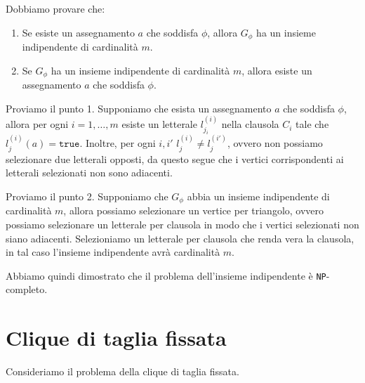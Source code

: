 \begin{itemize}
\begin{figure}[H]
    \end{figure}
    Dobbiamo provare che:
    \begin{enumerate}
        \item Se esiste un assegnamento $a$ che soddisfa $\phi$, allora $G_\phi$ ha un insieme indipendente
        di cardinalità $m$.
        \item Se $G_\phi$ ha un insieme indipendente di cardinalità $m$, allora esiste un assegnamento $a$
        che soddisfa $\phi$.
    \end{enumerate}

    Proviamo il punto 1. Supponiamo che esista un assegnamento $a$ che soddisfa $\phi$, allora per ogni
    $i = 1, \ldots, m$ esiste un letterale $l_{j_i}^{(i)}$ nella clausola $C_i$ tale che $l_j^{(i)}(a) = \texttt{true}$.
    Inoltre, per ogni $i, i'$ $l_j^{(i)} \neq l_j^{(i')}$, ovvero non possiamo selezionare due letterali
    opposti, da questo segue che i vertici corrispondenti ai letterali selezionati non sono adiacenti.

    Proviamo il punto 2. Supponiamo che $G_\phi$ abbia un insieme indipendente di cardinalità $m$, allora
    possiamo selezionare un vertice per triangolo, ovvero possiamo selezionare un letterale per clausola
    in modo che i vertici selezionati non siano adiacenti. Selezioniamo un letterale per clausola che renda
    vera la clausola, in tal caso l'insieme indipendente avrà cardinalità $m$.

    Abbiamo quindi dimostrato che il problema dell'insieme indipendente è \texttt{NP}-completo.
\end{itemize}

\section{Clique di taglia fissata}
Consideriamo il problema della clique di taglia fissata.

